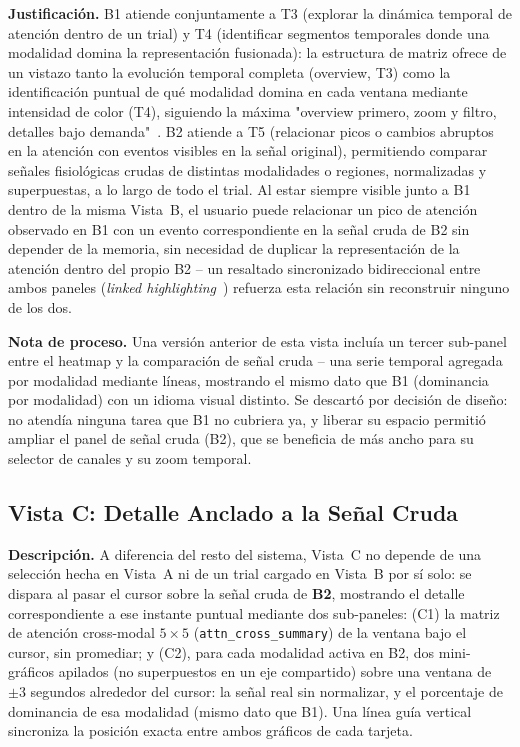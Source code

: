\textbf{Justificación.} B1 atiende conjuntamente a T3 (explorar la dinámica temporal de atención dentro de un trial) y T4 (identificar segmentos temporales donde una modalidad domina la representación fusionada): la estructura de matriz ofrece de un vistazo tanto la evolución temporal completa (overview, T3) como la identificación puntual de qué modalidad domina en cada ventana mediante intensidad de color (T4), siguiendo la máxima "overview primero, zoom y filtro, detalles bajo demanda"~\cite{shneiderman1996}. B2 atiende a T5 (relacionar picos o cambios abruptos en la atención con eventos visibles en la señal original), permitiendo comparar señales fisiológicas crudas de distintas modalidades o regiones, normalizadas y superpuestas, a lo largo de todo el trial. Al estar siempre visible junto a B1 dentro de la misma Vista~B, el usuario puede relacionar un pico de atención observado en B1 con un evento correspondiente en la señal cruda de B2 sin depender de la memoria, sin necesidad de duplicar la representación de la atención dentro del propio B2 -- un resaltado sincronizado bidireccional entre ambos paneles (\textit{linked highlighting}~\cite{becker1987brushing}) refuerza esta relación sin reconstruir ninguno de los dos.

\textbf{Nota de proceso.} Una versión anterior de esta vista incluía un tercer sub-panel entre el heatmap y la comparación de señal cruda -- una serie temporal agregada por modalidad mediante líneas, mostrando el mismo dato que B1 (dominancia por modalidad) con un idioma visual distinto. Se descartó por decisión de diseño: no atendía ninguna tarea que B1 no cubriera ya, y liberar su espacio permitió ampliar el panel de señal cruda (B2), que se beneficia de más ancho para su selector de canales y su zoom temporal.

\subsection{Vista C: Detalle Anclado a la Señal Cruda}
\label{sec:vista_c}

\textbf{Descripción.} A diferencia del resto del sistema, Vista~C no depende de una selección hecha en Vista~A ni de un trial cargado en Vista~B por sí solo: se dispara al pasar el cursor sobre la señal cruda de \textbf{B2}, mostrando el detalle correspondiente a ese instante puntual mediante dos sub-paneles: (C1) la matriz de atención cross-modal $5\times5$ (\texttt{attn\_cross\_summary}) de la ventana bajo el cursor, sin promediar; y (C2), para cada modalidad activa en B2, dos mini-gráficos apilados (no superpuestos en un eje compartido) sobre una ventana de $\pm3$ segundos alrededor del cursor: la señal real sin normalizar, y el porcentaje de dominancia de esa modalidad (mismo dato que B1). Una línea guía vertical sincroniza la posición exacta entre ambos gráficos de cada tarjeta.

